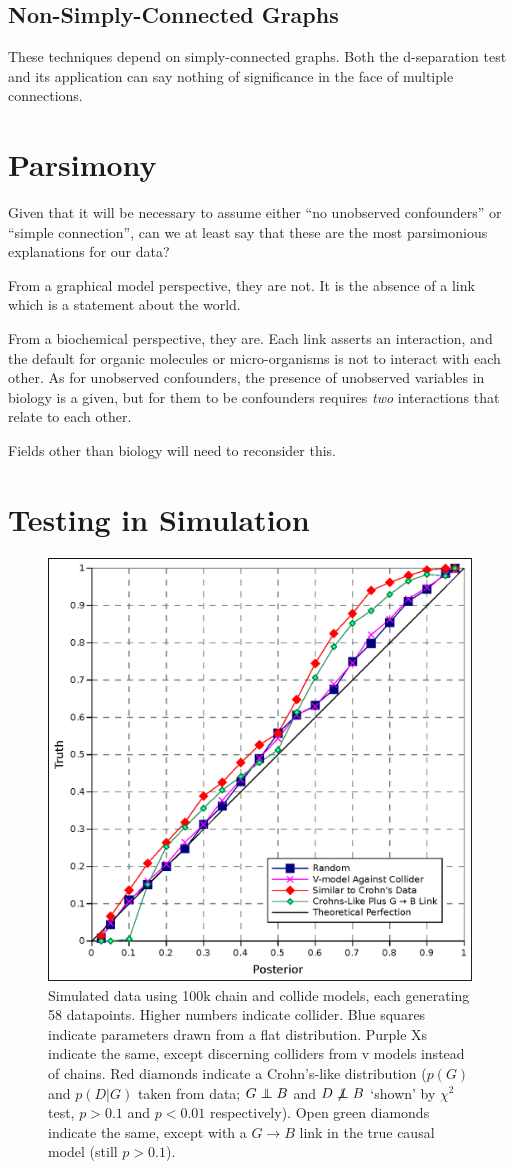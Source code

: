 \documentclass[letterpaper]{article}
\newcommand\indep{\protect\mathpalette{\protect\independenT}{\perp}}
\def\independenT#1#2{\mathrel{\rlap{$#1#2$}\mkern2mu{#1#2}}}
\begin{document}
\subsection{Non-Simply-Connected Graphs}

These techniques depend on simply-connected graphs.  Both the d-separation
test and its application can say nothing of significance in the face
of multiple connections.

\section{Parsimony}

Given that it will be necessary to assume either ``no unobserved
confounders'' or ``simple connection'', can we at least say that these
are the most parsimonious explanations for our data?

From a graphical model perspective, they are not.  It is the absence
of a link which is a statement about the world.

From a biochemical perspective, they are.  Each link asserts an
interaction, and the default for organic molecules or micro-organisms
is not to interact with each other.  As for unobserved confounders, the
presence of unobserved variables in biology is a given, but for them
to be confounders requires \textit{two} interactions that relate to
each other.

Fields other than biology will need to reconsider this.

\section{Testing in Simulation}

\begin{figure}[b!]
  \includegraphics[width=.5\textwidth]{test_direction_uni}
  \caption{Simulated data using 100k chain and collide models, each
    generating 58 datapoints.
    Higher numbers indicate collider.  Blue squares indicate
    parameters drawn from a flat distribution.  Purple Xs indicate the
    same, except discerning colliders from v models instead of
    chains. Red diamonds indicate a
    Crohn's-like distribution ($p(G)$ and $p(D|G)$ taken from
    data; $G\indep B$ and $D\not\indep B$ `shown' by $\chi^2$ test,
    $p>0.1$ and $p<0.01$ respectively).  Open green diamonds indicate
    the same, except with a $G\rightarrow B$ link in the true causal
    model (still $p>0.1$).}
  
  \label{dir_pla58}
\end{figure}
\end{document}

